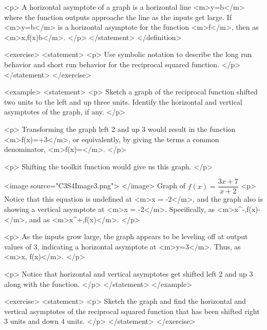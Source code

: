                 <p>
                    A horizontal asymptote of a graph is a horizontal line <m>y=b</m> where the function outputs approache the line as the inputs get large.
                    If <m>y=b</m> is a horizontal asymptote for the function <m>f</m>, then as <m>x\to \pm \infty,f(x)\to b</m>.
                </p>
            </statement>
        </definition>

        <exercise>
            <statement>
                <p>
                    Use symbolic notation to describe the long run behavior and short run behavior for the reciprocal squared function.
                </p>
            </statement>
        </exercise>

        <example>
            <statement>
                <p>
                    Sketch a graph of the reciprocal function shifted two units to the left and up three units.
                    Identify the horizontal and vertical asymptotes of the graph, if any.
                </p>

                <p>
                    Transforming the graph left 2 and up 3 would result in the function <m>f(x)=+3</m>, or equivalently, by giving the terms a common denominator, <m>f(x)=</m>.
                </p>

                <p>
                    Shifting the toolkit function would give us this graph.
                </p>

                <image source="C3S4Image3.png">
                </image>
                Graph of $f(x)=\dfrac{3x+7}{x+2}$
                <p>
                    Notice that this equation is undefined at <m>x = -2</m>, and the graph also is showing a vertical asymptote at <m>x = -2</m>.
                    Specifically, as <m>x^{-},f(x)\to -\infty</m>, and as <m>x^{+},f(x)\to \infty</m>.
                </p>

                <p>
                    As the inputs grow large, the graph appears to be leveling off at output values of 3, indicating a horizontal asymptote at <m>y=3</m>.
                    Thus, as <m>x\to \pm \infty, f(x)</m>.
                </p>

                <p>
                    Notice that horizontal and vertical asymptotes get shifted left 2 and up 3 along with the function.
                </p>
            </statement>
        </example>

        <exercise>
            <statement>
                <p>
                    Sketch the graph and find the horizontal and vertical asymptotes of the reciprocal squared function that has been shifted right 3 units and down 4 units.
                </p>
            </statement>
        </exercise>

